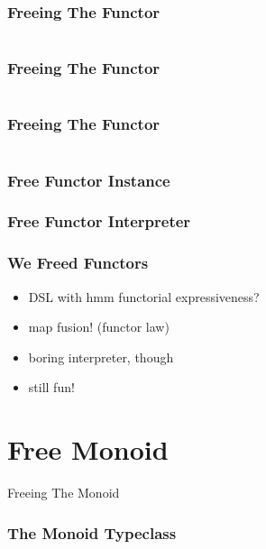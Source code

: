 \documentclass{beamer}
\begin{document}
\begin{frame}[fragile]
  \frametitle{Freeing The Functor}
  \inputminted[highlightlines={3-4}, highlightcolor=yellow!40]{scala}{snippets/free-functor2.scala}
\end{frame}

\begin{frame}[fragile]
  \frametitle{Freeing The Functor}
  \inputminted{scala}{snippets/free-functor3.scala}
\end{frame}

\begin{frame}[fragile]
  \frametitle{Freeing The Functor}
  \inputminted{scala}{snippets/free-functor4.scala}
\end{frame}

\begin{frame}[fragile]
  \frametitle{Free Functor Instance}
\end{frame}

\begin{frame}[fragile]
  \frametitle{Free Functor Interpreter}
\end{frame}

\begin{frame}
  \frametitle{We Freed Functors}
  \begin{itemize}
  \item DSL with hmm functorial expressiveness?
  \item map fusion! (functor law)
  \item boring interpreter, though
  \item still fun!
  \end{itemize}
\end{frame}

\section{Free Monoid}
\label{sec:free-monoid}

\begin{frame}
  \begin{center}
    \Huge
    Freeing The Monoid
  \end{center}
\end{frame}

\begin{frame}
  \frametitle{The Monoid Typeclass}
  \inputminted{scala}{snippets/monoid-typeclass.scala}
\end{frame}
\end{document}
